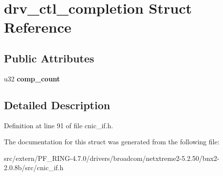 \hypertarget{structdrv__ctl__completion}{
\section{drv\_\-ctl\_\-completion Struct Reference}
\label{structdrv__ctl__completion}
}
\subsection*{Public Attributes}
\begin{DoxyCompactItemize}
\item 
\hypertarget{structdrv__ctl__completion_a1590d17e990a9d91d3bf74091883b1f8}{
u32 {\bfseries comp\_\-count}}
\label{structdrv__ctl__completion_a1590d17e990a9d91d3bf74091883b1f8}

\end{DoxyCompactItemize}


\subsection{Detailed Description}


Definition at line 91 of file cnic\_\-if.h.



The documentation for this struct was generated from the following file:\begin{DoxyCompactItemize}
\item 
src/extern/PF\_\-RING-\/4.7.0/drivers/broadcom/netxtreme2-\/5.2.50/bnx2-\/2.0.8b/src/cnic\_\-if.h\end{DoxyCompactItemize}
